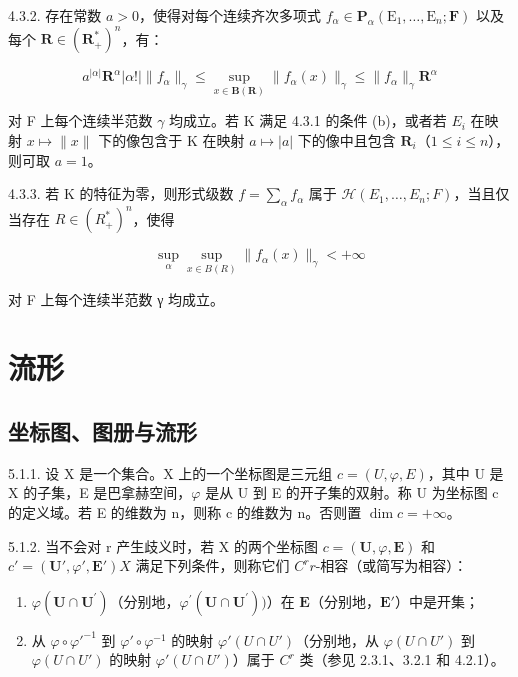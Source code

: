 4.3.2. 存在常数 \(a > 0\)，使得对每个连续齐次多项式 \(f_{\alpha} \in \mathbf{P}_{\alpha}(\mathrm{E}_{1}, \ldots, \mathrm{E}_{n}; \mathbf{F})\) 以及每个 \(\mathbf{R} \in (\mathbf{R}_{+}^{*})^{n}\)，有：

\[
a ^ {| \alpha |} \mathbf {R} ^ {\alpha} | \alpha ! | \| f _ {\alpha} \| _ {\gamma} \leqslant \sup _ {x \in \mathbf {B} (\mathbf {R})} \| f _ {\alpha} (x) \| _ {\gamma} \leqslant \| f _ {\alpha} \| _ {\gamma} \mathbf {R} ^ {\alpha}
\]

对 F 上每个连续半范数 \(\gamma\) 均成立。若 K 满足 4.3.1 的条件 (b)，或者若 \(E_{i}\) 在映射 \(x \mapsto \|x\|\) 下的像包含于 K 在映射 \(a \mapsto |a|\) 下的像中且包含 \(\mathbf{R}_{i}\)（\(1 \leqslant i \leqslant n\)），则可取 \(a = 1\)。

4.3.3. 若 K 的特征为零，则形式级数 \(f = \sum_{\alpha} f_{\alpha}\) 属于 \(\mathcal{H}(E_1, \ldots, E_n; F)\)，当且仅当存在 \(R \in (R_+^*)^n\)，使得

\[
\sup _ {\alpha} \sup _ {x \in B (R)} \| f _ {\alpha} (x) \| _ {\gamma} <   + \infty
\]

对 F 上每个连续半范数 γ 均成立。

\section{流形}

\subsection{坐标图、图册与流形}

5.1.1. 设 X 是一个集合。X 上的一个坐标图是三元组 \(c = (U, \varphi, E)\)，其中 U 是 X 的子集，E 是巴拿赫空间，\(\varphi\) 是从 U 到 E 的开子集的双射。称 U 为坐标图 c 的定义域。若 E 的维数为 n，则称 c 的维数为 n。否则置 \(\dim c = +\infty\)。

5.1.2. 当不会对 r 产生歧义时，若 X 的两个坐标图 \(c = (\mathbf{U}, \varphi, \mathbf{E})\) 和 \(c' = (\mathbf{U}', \varphi', \mathbf{E}')\)\(X\) 满足下列条件，则称它们 \(C^r\)\(r\)-相容（或简写为相容）：

\begin{enumerate}
\def\labelenumi{(\alph{enumi})}
\item
  \(\varphi (\mathbf{U}\cap \mathbf{U}^{\prime})\)（分别地，\(\varphi^{\prime}(\mathbf{U}\cap \mathbf{U}^{\prime}))\)）在 \(\mathbf{E}\)（分别地，\(\mathbf{E}'\)）中是开集；
\item
  从 \(\varphi \circ \varphi'^{-1}\) 到 \(\varphi' \circ \varphi^{-1}\) 的映射 \(\varphi'(U \cap U')\)（分别地，从 \(\varphi(U \cap U')\) 到 \(\varphi(U \cap U')\) 的映射 \(\varphi'(U \cap U')\)）属于 \(C^r\) 类（参见 2.3.1、3.2.1 和 4.2.1）。
\end{enumerate}

